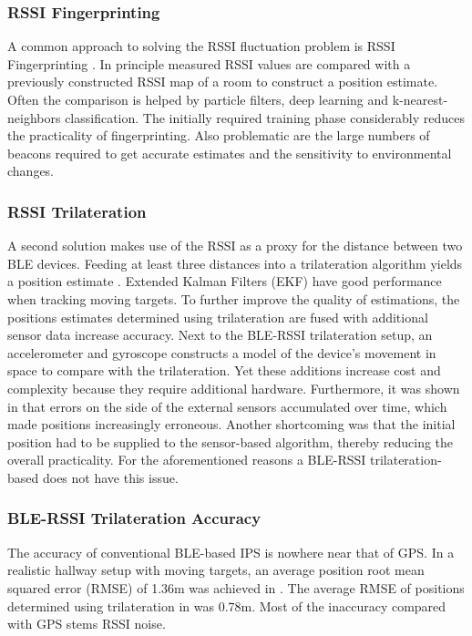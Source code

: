 \documentclass[a4paper, oneside]{ipsreport}
\begin{document}
\subsubsection{RSSI Fingerprinting}
A common approach to solving the RSSI fluctuation problem is RSSI Fingerprinting \autocite{Fingerprinting}. In principle measured RSSI values are compared with a previously constructed RSSI map of a room to construct a position estimate. Often the comparison is helped by particle filters, deep learning and k-nearest-neighbors classification. The initially required training phase considerably reduces the practicality of fingerprinting. Also problematic are the large numbers of beacons required to get accurate estimates and the sensitivity to environmental changes.

\subsubsection{RSSI Trilateration}
A second solution makes use of the RSSI as a proxy for the distance between two BLE devices. Feeding at least three distances into a trilateration algorithm yields a position estimate \autocite{BLE}. Extended Kalman Filters (EKF) have good performance when tracking moving targets. To further improve the quality of estimations, the positions estimates determined using trilateration are fused with additional sensor data increase accuracy. Next to the BLE-RSSI trilateration setup, an accelerometer and gyroscope constructs a model of the device's movement in space to compare with the trilateration. Yet these additions increase cost and complexity because they require additional hardware. Furthermore, it was shown in \autocite{ImuTrilaterationFusion} that errors on the side of the external sensors accumulated over time, which made positions increasingly erroneous. Another shortcoming was that the initial position had to be supplied to the sensor-based algorithm, thereby reducing the overall practicality. For the aforementioned reasons a BLE-RSSI trilateration-based does not have this issue.

\subsubsection{BLE-RSSI Trilateration Accuracy}
The accuracy of conventional BLE-based IPS is nowhere near that of GPS. In a realistic hallway setup with moving targets, an average position root mean squared error (RMSE) of 1.36m was achieved in \autocite{AntennaDiversity}. The average RMSE of positions determined using trilateration in \autocite{ImuTrilaterationFusion} was 0.78m. Most of the inaccuracy compared with GPS stems RSSI noise.
\end{document}
